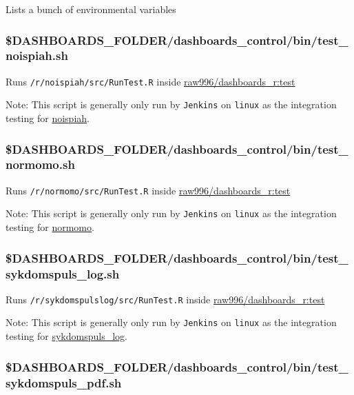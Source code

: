 \documentclass[12pt,]{article}
\begin{document}
Lists a bunch of environmental variables

\subsubsection{\$DASHBOARDS\_FOLDER/dashboards\_control/bin/test\_noispiah.sh}\label{dashboards_folderdashboards_controlbintest_noispiah.sh}

Runs \texttt{/r/noispiah/src/RunTest.R} inside
\href{https://github.com/raubreywhite/dashboards_control/blob/master/infrastructure/dashboards_r/Dockerfile}{raw996/dashboards\_r:test}

Note: This script is generally only run by \texttt{Jenkins} on
\texttt{linux} as the integration testing for
\href{https://folkehelseinstituttet.github.io/dashboards_noispiah/}{noispiah}.

\subsubsection{\$DASHBOARDS\_FOLDER/dashboards\_control/bin/test\_normomo.sh}\label{dashboards_folderdashboards_controlbintest_normomo.sh}

Runs \texttt{/r/normomo/src/RunTest.R} inside
\href{https://github.com/raubreywhite/dashboards_control/blob/master/infrastructure/dashboards_r/Dockerfile}{raw996/dashboards\_r:test}

Note: This script is generally only run by \texttt{Jenkins} on
\texttt{linux} as the integration testing for
\href{https://folkehelseinstituttet.github.io/dashboards_normomo/}{normomo}.

\subsubsection{\$DASHBOARDS\_FOLDER/dashboards\_control/bin/test\_sykdomspuls\_log.sh}\label{dashboards_folderdashboards_controlbintest_sykdomspuls_log.sh}

Runs \texttt{/r/sykdomspulslog/src/RunTest.R} inside
\href{https://github.com/raubreywhite/dashboards_control/blob/master/infrastructure/dashboards_r/Dockerfile}{raw996/dashboards\_r:test}

Note: This script is generally only run by \texttt{Jenkins} on
\texttt{linux} as the integration testing for
\href{https://folkehelseinstituttet.github.io/dashboards_sykdomspuls_log/}{sykdomspuls\_log}.

\subsubsection{\$DASHBOARDS\_FOLDER/dashboards\_control/bin/test\_sykdomspuls\_pdf.sh}\label{dashboards_folderdashboards_controlbintest_sykdomspuls_pdf.sh}
\end{document}
